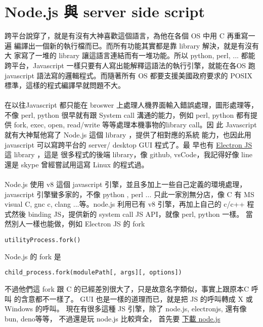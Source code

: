 \section{Node.js 與 server side script}
跨平台說穿了，就是有沒有大神喜歡這個語言，為他在各個 OS 中用 C 再重寫一遍
編譯出一個新的執行檔而已。而所有功能其實都是靠 library 解決，就是有沒有大
家寫了一堆的 library 讓這語言連結而有一堆功能。所以 python, perl, ...
都能跨平台，Javascript 一樣只要有人寫出能解釋這語法的執行引擎，就能在各OS
跑 javascript 語法寫的邏輯程式。而隨著所有 OS 都要支援美國政府要求的 POSIX
標準，這樣的程式編譯早就問題不大。
\\\\
在以往Javascript 都只能在 broswer 上處理人機界面輸入錯誤處理，圖形處理等，
不像 perl, python 很早就有跟 System call 溝通的能力，例如 perl, python
都有提供 fork, exec, open, read/write 等等處理本機事物的library call。因
此 Javascript 就有大神幫他寫了 Node.js 這個 library ，提供了相對應的系統
能力，也因此用 javascript 可以寫跨平台的 server/ desktop GUI 程式了。最
早也有 \href{https://www.electronjs.org/}{Electron JS} 這 library ，這是
很多程式的後端 library，像 github, vsCode，我記得好像 line 還是 skype 
曾經嘗試用這寫 Linux 的程式過。
\\\\
Node.js 使用 v8 這個 javascript 引擎，並且多加上一些自己定義的環境處理，
javascript 引擎蠻多家的，不像 python , perl ... 只此一家別無分店，像 C 有
MS visual C, gnc c, clang ...等。node.js 利用已有 v8 引擎，再加上自己的 c/c++
程式然後 binding JS，提供新的 system call JS API，就像 perl, python 一樣。
當然別人一樣也能做，例如 Electron JS 的 fork
\begin{verbatim}
utilityProcess.fork()
\end{verbatim}
Node.js 的 fork 是
\begin{verbatim}
child_process.fork(modulePath[, args][, options])
\end{verbatim}
不過他們這 fork 跟 C 的已經差別很大了，只是故意名字類似，事實上跟原本C 呼叫
的含意都不一樣了。
GUI 也是一樣的道理而已，就是把 JS 的呼叫轉成 X 或 Windows 的呼叫。
現在有很多這種 JS 引擎，除了 node.js, electronjs, 還有像 bun, deno等等，
不過還是玩 node.js 比較齊全，
首先要 \href{https://nodejs.org/en/download}{下載 node.js}

